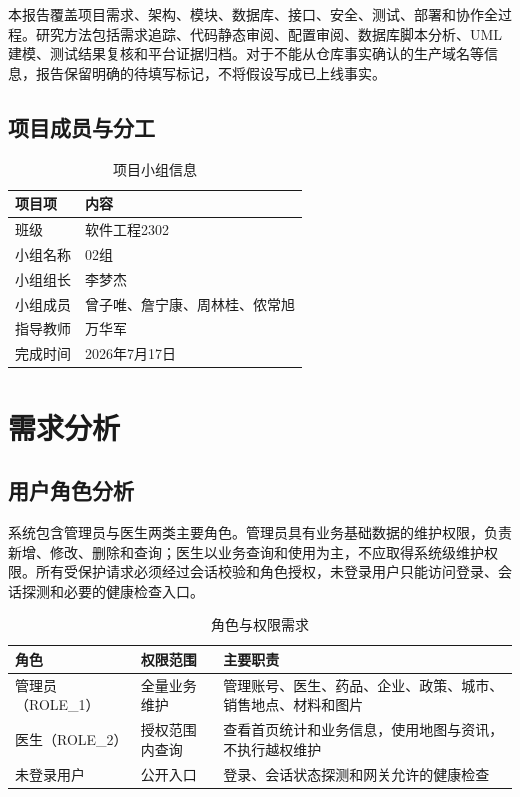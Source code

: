 \documentclass[UTF8,a4paper,12pt,openany,fontset=windows]{ctexrep}
\begin{document}
本报告覆盖项目需求、架构、模块、数据库、接口、安全、测试、部署和协作全过程。研究方法包括需求追踪、代码静态审阅、配置审阅、数据库脚本分析、UML 建模、测试结果复核和平台证据归档。对于不能从仓库事实确认的生产域名等信息，报告保留明确的待填写标记，不将假设写成已上线事实。

\section{项目成员与分工}

\begin{table}[H]
  \centering
  \caption{项目小组信息}
  \begin{tabularx}{\textwidth}{p{3.2cm}L}
    \toprule
    项目项 & 内容 \\
    \midrule
    班级 & 软件工程2302 \\
    小组名称 & 02组 \\
    小组组长 & 李梦杰 \\
    小组成员 & 曾子唯、詹宁康、周林桂、侬常旭 \\
    指导教师 & 万华军 \\
    完成时间 & 2026年7月17日 \\
    \bottomrule
  \end{tabularx}
\end{table}

\chapter{需求分析}

\section{用户角色分析}

系统包含管理员与医生两类主要角色。管理员具有业务基础数据的维护权限，负责新增、修改、删除和查询；医生以业务查询和使用为主，不应取得系统级维护权限。所有受保护请求必须经过会话校验和角色授权，未登录用户只能访问登录、会话探测和必要的健康检查入口。

\begin{table}[H]
  \centering
  \caption{角色与权限需求}
  \begin{tabularx}{\textwidth}{p{2.8cm}p{3.5cm}L}
    \toprule
    角色 & 权限范围 & 主要职责 \\
    \midrule
    管理员（ROLE\_1） & 全量业务维护 & 管理账号、医生、药品、企业、政策、城市、销售地点、材料和图片 \\
    医生（ROLE\_2） & 授权范围内查询 & 查看首页统计和业务信息，使用地图与资讯，不执行越权维护 \\
    未登录用户 & 公开入口 & 登录、会话状态探测和网关允许的健康检查 \\
    \bottomrule
  \end{tabularx}
\end{table}
\end{document}
